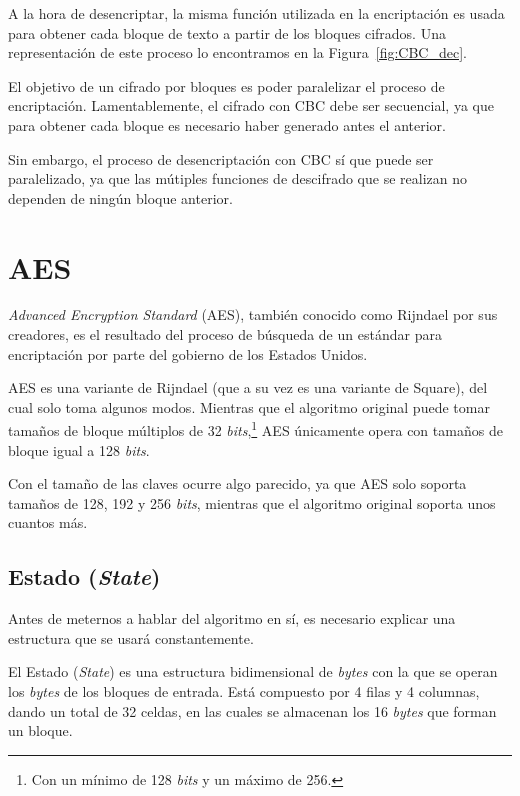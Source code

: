 A la hora de desencriptar, la misma función utilizada en la encriptación es usada para obtener cada bloque de texto a partir de los bloques cifrados. Una representación de este proceso lo encontramos en la Figura~\ref{fig:CBC_dec}.

El objetivo de un cifrado por bloques es poder paralelizar el proceso de encriptación. Lamentablemente, el cifrado con CBC debe ser secuencial, ya que para obtener cada bloque es necesario haber generado antes el anterior.

Sin embargo, el proceso de desencriptación con CBC sí que puede ser paralelizado, ya que las mútiples funciones de descifrado que se realizan no dependen de ningún bloque anterior. \emph{\parencite{Reference24}}


\section{AES}

\label{AES}

\emph{Advanced Encryption Standard} (AES), también conocido como Rijndael por sus creadores, es el resultado del proceso de búsqueda de un estándar para encriptación por parte del gobierno de los Estados Unidos.

AES es una variante de Rijndael (que a su vez es una variante de Square), del cual solo toma algunos modos. Mientras que el algoritmo original puede tomar tamaños de bloque múltiplos de 32 \emph{bits},\footnote{Con un mínimo de 128 \emph{bits} y un máximo de 256.} AES únicamente opera con tamaños de bloque igual a 128 \emph{bits}.

Con el tamaño de las claves ocurre algo parecido, ya que AES solo soporta tamaños de 128, 192 y 256 \emph{bits}, mientras que el algoritmo original soporta unos cuantos más. \emph{\parencite{Reference25}}

\subsection{Estado (\emph{State})}

Antes de meternos a hablar del algoritmo en sí, es necesario explicar una estructura que se usará constantemente.

El Estado (\emph{State}) es una estructura bidimensional de \emph{bytes} con la que se operan los \emph{bytes} de los bloques de entrada. Está compuesto por 4 filas y 4 columnas, dando un total de 32 celdas, en las cuales se almacenan los 16 \emph{bytes} que forman un bloque. \emph{\parencite{Reference26}}

